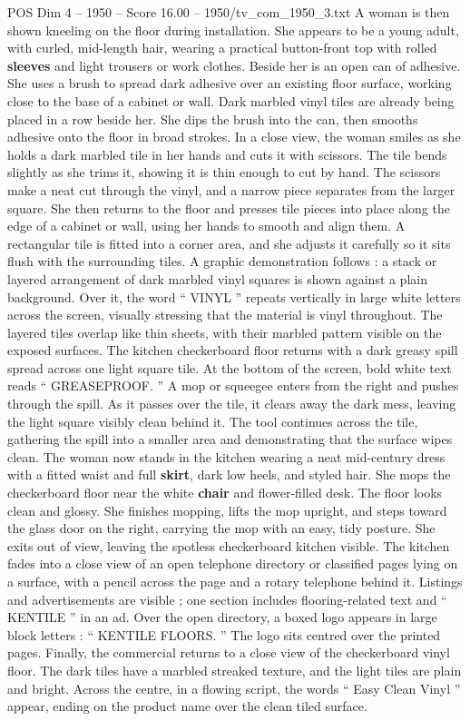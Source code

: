 \begin{textsample}{POS Dim 4 – 1950 – Score 16.00 – 1950/tv\_com\_1950\_3.txt}
A woman is then shown kneeling on the floor during installation.
She appears to be a young adult, with curled, mid-length hair, wearing a practical button-front top with rolled \textbf{sleeves} and light trousers or work clothes.
Beside her is an open can of adhesive.
She uses a brush to spread dark adhesive over an existing floor surface, working close to the base of a cabinet or wall.
Dark marbled vinyl tiles are already being placed in a row beside her.
She dips the brush into the can, then smooths adhesive onto the floor in broad strokes.
In a close view, the woman smiles as she holds a dark marbled tile in her hands and cuts it with scissors.
The tile bends slightly as she trims it, showing it is thin enough to cut by hand.
The scissors make a neat cut through the vinyl, and a narrow piece separates from the larger square.
She then returns to the floor and presses tile pieces into place along the edge of a cabinet or wall, using her hands to smooth and align them.
A rectangular tile is fitted into a corner area, and she adjusts it carefully so it sits flush with the surrounding tiles.
A graphic demonstration follows : a stack or layered arrangement of dark marbled vinyl squares is shown against a plain background.
Over it, the word “ VINYL ” repeats vertically in large white letters across the screen, visually stressing that the material is vinyl throughout.
The layered tiles overlap like thin sheets, with their marbled pattern visible on the exposed surfaces.
The kitchen checkerboard floor returns with a dark greasy spill spread across one light square tile.
At the bottom of the screen, bold white text reads “ GREASEPROOF. ” A mop or squeegee enters from the right and pushes through the spill.
As it passes over the tile, it clears away the dark mess, leaving the light square visibly clean behind it.
The tool continues across the tile, gathering the spill into a smaller area and demonstrating that the surface wipes clean.
The woman now stands in the kitchen wearing a neat mid-century dress with a fitted waist and full \textbf{skirt}, dark low heels, and styled hair.
She mops the checkerboard floor near the white \textbf{chair} and flower-filled desk.
The floor looks clean and glossy.
She finishes mopping, lifts the mop upright, and steps toward the glass door on the right, carrying the mop with an easy, tidy posture.
She exits out of view, leaving the spotless checkerboard kitchen visible.
The kitchen fades into a close view of an open telephone directory or classified pages lying on a surface, with a pencil across the page and a rotary telephone behind it.
Listings and advertisements are visible ; one section includes flooring-related text and “ KENTILE ” in an ad.
Over the open directory, a boxed logo appears in large block letters : “ KENTILE FLOORS. ” The logo sits centred over the printed pages.
Finally, the commercial returns to a close view of the checkerboard vinyl floor.
The dark tiles have a marbled streaked texture, and the light tiles are plain and bright.
Across the centre, in a flowing script, the words “ Easy Clean Vinyl ” appear, ending on the product name over the clean tiled surface.


\end{textsample}
